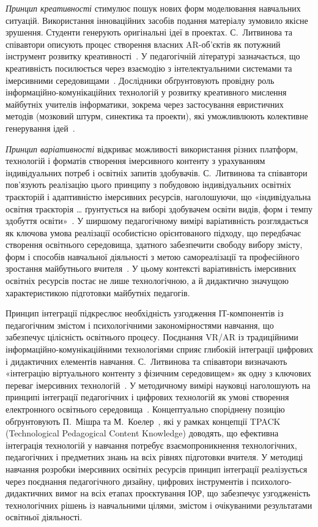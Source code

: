 \emph{Принцип креативності} стимулює пошук нових форм моделювання навчальних ситуацій. Використання інноваційних засобів подання матеріалу зумовило якісне зрушення. Студенти генерують оригінальні ідеї в проектах. С.~Литвинова та співавтори описують процес створення власних AR-об'єктів як потужний інструмент розвитку креативності~\cite[c.~56--57]{Lytvynova2023Monograph}. У педагогічній літературі зазначається, що креативність посилюється через взаємодію з інтелектуальними системами та імерсивними середовищами~\cite{Dychkivska2012Innovative}. Дослідники обґрунтовують провідну роль інформаційно-комунікаційних технологій у розвитку креативного мислення майбутніх учителів інформатики, зокрема через застосування евристичних методів (мозковий штурм, синектика та проекти), які уможливлюють колективне генерування ідей~\cite{Mintii2023Ref}.

\emph{Принцип варіативності} відкриває можливості використання різних платформ, технологій і форматів створення імерсивного контенту з урахуванням індивідуальних потреб і освітніх запитів здобувачів. С.~Литвинова та співавтори пов'язують реалізацію цього принципу з побудовою індивідуальних освітніх траєкторій і адаптивністю імерсивних ресурсів, наголошуючи, що «індивідуальна освітня траєкторія \ldots{} ґрунтується на виборі здобувачем освіти видів, форм і темпу здобуття освіти»~\cite[c.~5; 27]{Lytvynova2023Monograph}. У ширшому педагогічному вимірі варіативність розглядається як ключова умова реалізації особистісно орієнтованого підходу, що передбачає створення освітнього середовища, здатного забезпечити свободу вибору змісту, форм і способів навчальної діяльності з метою самореалізації та професійного зростання майбутнього вчителя~\cite{Dychkivska2012Innovative}. У цьому контексті варіативність імерсивних освітніх ресурсів постає не лише технологічною, а й дидактично значущою характеристикою підготовки майбутніх педагогів.

Принцип інтеграції підкреслює необхідність узгодження ІТ-компонентів із педагогічним змістом і психологічними закономірностями навчання, що забезпечує цілісність освітнього процесу. Поєднання VR/AR із традиційними інформаційно-комунікаційними технологіями сприяє глибокій інтеграції цифрових і дидактичних елементів навчання. С.~Литвинова та співавтори визначають «інтеграцію віртуального контенту з фізичним середовищем» як одну з ключових переваг імерсивних технологій~\cite[c.~6]{Lytvynova2023Monograph}. У методичному вимірі науковці наголошують на принципі інтеграції педагогічних і цифрових технологій як умові створення електронного освітнього середовища~\cite{Lytvynova2023Monograph}. Концептуально споріднену позицію обґрунтовують П.~Мішра та М.~Коелер~\cite{Gurevych2015Integration}, які у рамках концепції TPACK (Technological Pedagogical Content Knowledge) доводять, що ефективна інтеграція технологій у навчання потребує взаємопроникнення технологічних, педагогічних і предметних знань на всіх рівнях підготовки вчителя. У методиці навчання розробки імерсивних освітніх ресурсів принцип інтеграції реалізується через поєднання педагогічного дизайну, цифрових інструментів і психолого-дидактичних вимог на всіх етапах проєктування ІОР, що забезпечує узгодженість технологічних рішень із навчальними цілями, змістом і очікуваними результатами освітньої діяльності.

